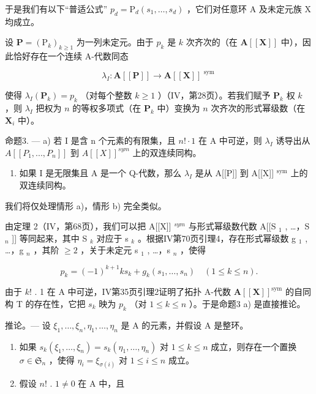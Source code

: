 于是我们有以下“普适公式” \(p_d = \mathrm{P}_d(s_1, \ldots, s_d)\) ，它们对任意环 A 及未定元族 X 均成立。

设 \(\mathbf{P} = (\mathrm{P}_k)_{k\geqslant 1}\) 为一列未定元。由于 \(p_k\) 是 \(k\) 次齐次的（在 \(\mathbf{A}[[\mathbf{X}]]\) 中），因此恰好存在一个连续 A-代数同态

\[
\lambda_ {I}: \mathbf {A} [ [ \mathbf {P} ] ] \rightarrow \mathbf {A} [ [ \mathbf {X} ] ] ^ {\text { sym }}
\]

使得 \(\lambda_{I}(\mathbf{P}_{k}) = p_{k}\) （对每个整数 \(k \geqslant 1\) ）（IV，第28页）。若我们赋予 \(\mathbf{P}_{k}\) 权 \(k\) ，则 \(\lambda_{I}\) 把权为 \(n\) 的等权多项式（在 \(\mathbf{P}_{k}\) 中）变换为 \(n\) 次齐次的形式幂级数（在 \(\mathbf{X}_{i}\) 中）。

命题3. --- a) 若 I 是含 n 个元素的有限集，且 \(n! \cdot 1\) 在 A 中可逆，则 \(\lambda_{I}\) 诱导出从 \(A[[P_{1}, ..., P_{n}]]\) 到 \(A[[X]]^{sym}\) 上的双连续同构。

\begin{enumerate}
\def\labelenumi{\alph{enumi})}
\setcounter{enumi}{1}
\tightlist
\item
  如果 I 是无限集且 A 是一个 Q-代数，那么 \(\lambda_{I}\) 是从 A{[}{[}P{]}{]} 到 A{[}{[}X{]}{]} \(^{\text{sym}}\) 上的双连续同构。
\end{enumerate}

我们将仅处理情形 a)，情形 b) 完全类似。

由定理 2（IV，第68页），我们可以把 A{[}{[}X{]}{]} \(^{sym}\) 与形式幂级数代数 A{[}{[}S \(_1\) , \ldots，S \(_n\) {]}{]} 等同起来，其中 S \(_k\) 对应于 s \(_k\) 。根据IV第70页引理4，存在形式幂级数 g \(_1\) , \ldots，g \(_n\) ，其阶 \(\geqslant 2\) ，关于未定元 s \(_1\) , \ldots，s \(_n\) ，使得

\[
p _ {k} = (- 1) ^ {k + 1} k s _ {k} + g _ {k} (s _ {1}, \dots , s _ {n}) \quad (1 \leqslant k \leqslant n).
\]

由于 \(k!\) . 1 在 A 中可逆，IV第35页引理2证明了拓扑 A-代数 \(\mathbf{A}[[\mathbf{X}]]^{\mathrm{sym}}\) 的自同构 T 的存在性，它把 \(s_k\) 映为 \(p_k\) （对 \(1 \leqslant k \leqslant n\) ）。于是命题3 a) 是直接推论。

推论。--- 设 \(\xi_1, \ldots, \xi_n, \eta_1, \ldots, \eta_n\) 是 A 的元素，并假设 A 是整环。

\begin{enumerate}
\def\labelenumi{\alph{enumi})}
\item
  如果 \(s_k(\xi_1, \ldots, \xi_n) = s_k(\eta_1, \ldots, \eta_n)\) 对 \(1 \leqslant k \leqslant n\) 成立，则存在一个置换 \(\sigma \in \mathfrak{S}_n\) ，使得 \(\eta_i = \xi_{\sigma(i)}\) 对 \(1 \leqslant i \leqslant n\) 成立。
\item
  假设 \(n!\) . \(1 \neq 0\) 在 A 中，且
\end{enumerate}


